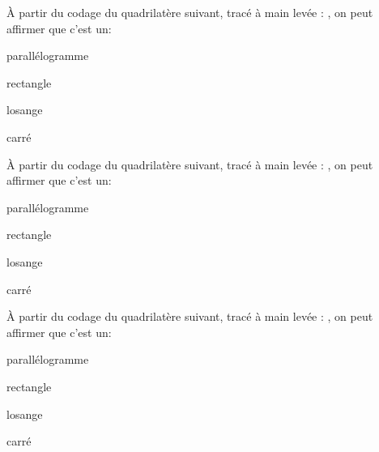 \begin{QCM}
  \begin{GroupeQCM}
\begin{exercice}
À partir du codage du quadrilatère suivant, tracé à main levée : \hspace{0.5em} \raisebox{-0.5\height}{}, on peut affirmer que c'est un:
      \begin{ChoixQCM}{4}
      \item parallélogramme
      \item rectangle
      \item losange
      \item carré
      \end{ChoixQCM}
\begin{corrige}
   \end{corrige}
    \end{exercice}

\begin{exercice}
À partir du codage du quadrilatère suivant, tracé à main levée : \hspace{0.5em} \raisebox{-0.5\height}{}, on peut affirmer que c'est un:
      \begin{ChoixQCM}{4}
      \item parallélogramme
      \item rectangle
      \item losange
      \item carré
      \end{ChoixQCM}
\begin{corrige}
   \end{corrige}
    \end{exercice}

\begin{exercice}
À partir du codage du quadrilatère suivant, tracé à main levée : \hspace{0.5em} \raisebox{-0.5\height}{}, on peut affirmer que c'est un:
      \begin{ChoixQCM}{4}
      \item parallélogramme
      \item rectangle
      \item losange
      \item carré
      \end{ChoixQCM}
\begin{corrige}
   \end{corrige}
    \end{exercice}

\end{GroupeQCM}
\end{QCM}

  
